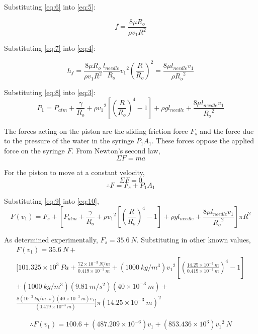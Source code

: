 \documentclass{article}
\begin{document}
Substituting \eqref{eq:6} into \eqref{eq:5}:

\[ f = \frac{8 \mu R_{o}}{\rho v_{1} R^{2}} \tag{7} \label{eq:7} \]

Substituting \eqref{eq:7} into \eqref{eq:4}:

\[ h_{f} = \frac{8 \mu R_{o}}{\rho v_{1} R^{2}} \frac{l_{needle}}{R_{o}} {v_{1}}^2 \left(\frac{R}{R_{o}}\right)^2 = \frac{8 \mu l_{needle} v_{1} }{\rho {R_{o}}^2} \tag{8} \label{eq:8} \]

Substituting \eqref{eq:8} into \eqref{eq:3}:
\[ P_{1} = P_{atm} + \frac{\gamma}{R_{o}} + \rho{v_{1}}^2\left[\left(\frac{R}{R_{o}}\right)^4  - 1 \right] + \rho gl_{needle} + \frac{8 \mu l_{needle} v_{1} }{{R_{o}}^2} \tag{9} \label{eq:9} \]

The forces acting on the piston are the sliding friction force $F_{s}$ and the force due to the pressure of the water in the syringe $P_{1}A_{1}$. These forces oppose the applied force on the syringe $F$. From Newton's second law,
\[ \Sigma F = ma \]

For the piston to move at a constant velocity,
\[ \Sigma F = 0 \]
\[ \therefore F = F_{s} + P_{1}A_{1} \tag{10} \label{eq:10} \]

Substituting \eqref{eq:9} into \eqref{eq:10},
\[ F(v_{1}) = F_{s} + \left[P_{atm} + \frac{\gamma}{R_{o}} + \rho{v_{1}}^2\left[\left(\frac{R}{R_{o}}\right)^4  - 1 \right] + \rho gl_{needle} + \frac{8 \mu l_{needle} v_{1} }{{R_{o}}^2} \right] \pi R^{2}\]

As determined experimentally, $F_{s} = 35.6 \ N$. Substituting in other known values,
\begin{multline*}
F(v_{1}) = 35.6 \ N + \\ \bigg[ 101.325 \times 10^{3} \ Pa + \frac{72 \times 10^{-3} \ N/m}{0.419 \times 10^{-3} \ m} +\left(1000 \ kg/m^3 \right) {v_{1}}^2 \left[\left(\frac{14.25 \times 10^{-3} \ m}{0.419 \times 10^{-3} \ m}\right)^4  - 1 \right] \\ + \left(1000 \ kg/m^3 \right) \left( 9.81 \ m/s^2 \right) \left( 40 \times 10^{-3} \ m \right) + \\ \frac{8 \left( 10^{-3} \ kg/m \cdot s \right) \left( 40 \times 10^{-3} \ m \right) v_{1}}{\left( 0.419 \times 10^{-3} \ m \right)} \bigg] \pi {\left( 14.25 \times 10^{-3} \ m \right)}^{2}
\end{multline*}

\[ \therefore F(v_{1}) = 100.6 + (487.209 \times 10^{-6}) v_{1} + (853.436 \times 10^{3}) {v_{1}}^2 \ N \tag{11} \label{eq:11}\]
\end{document}
